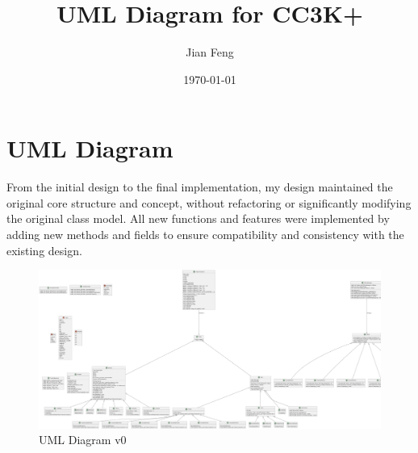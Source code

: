 \documentclass{article}
\begin{document}
\title{UML Diagram for CC3K+}
\author{Jian Feng}
\date{\today}
\maketitle

\section{UML Diagram}
From the initial design to the final implementation, my design maintained the original core structure and concept, without refactoring or significantly modifying the original class model. All new functions and features were implemented by adding new methods and fields to ensure compatibility and consistency with the existing design.
\begin{figure}[htbp]
    \centering
    \includegraphics[width=\linewidth]{./out/uml_v0/uml_v0.png} %
    \caption{UML Diagram v0}
    \label{fig:uml-diagram-0}
\end{figure}
\end{document}
